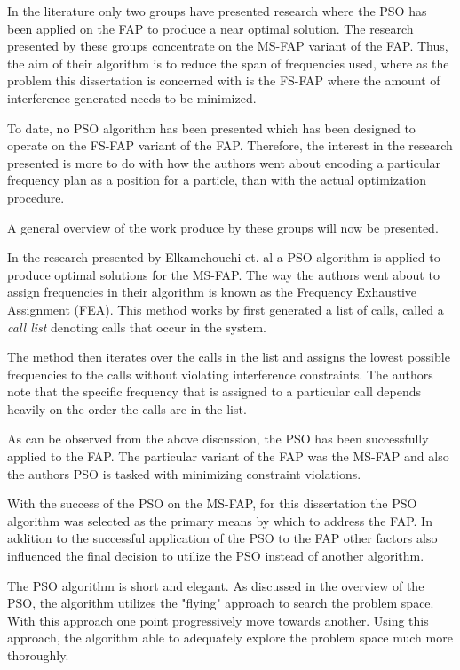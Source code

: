 In the literature only two groups have presented research where the PSO has been applied on the FAP to produce a near optimal solution. The research presented by these groups concentrate on the MS-FAP variant of the FAP. Thus, the aim of their algorithm is to reduce the span of frequencies used, where as the problem this dissertation is concerned with is the FS-FAP where the amount of interference generated needs to be minimized. 

To date, no PSO algorithm has been presented which has been designed to operate on the FS-FAP variant of the FAP. Therefore, the interest in the research presented is more to do with how the authors went about encoding a particular frequency plan as a position for a particle, than with the actual optimization procedure.

A general overview of the work produce by these groups will now be presented.

In the research presented by Elkamchouchi et. al\cite{EgyptFAPPSO} a PSO algorithm is applied to produce optimal solutions for the MS-FAP. The way the authors went about to assign frequencies in their algorithm is known as the Frequency Exhaustive Assignment (FEA).
This method works by first generated a list of calls, called a \emph{call list} denoting calls that occur in the system\cite{EgyptFAPPSO}. 

The method then iterates over the calls in the list and assigns the lowest possible frequencies to the calls without violating interference constraints\cite{EgyptFAPPSO}. The authors note that the specific frequency that is assigned to a particular call depends heavily on the order the calls are in the list\cite{EgyptFAPPSO}.

As can be observed from the above discussion, the PSO has been successfully applied to the FAP. The particular variant of the FAP was the MS-FAP and also the authors PSO is tasked with minimizing constraint violations.

With the success of the PSO on the MS-FAP, for this dissertation the PSO algorithm was selected as the primary means by which to address the FAP. In addition to the successful application of the PSO to the FAP other factors also influenced the final decision to utilize the PSO instead of another algorithm.

The PSO algorithm is short and elegant. As discussed in the overview of the PSO, the algorithm utilizes the "flying" approach to search the problem space. With this approach one point progressively move towards another. Using this approach, the algorithm able to adequately explore the problem space much more thoroughly.

